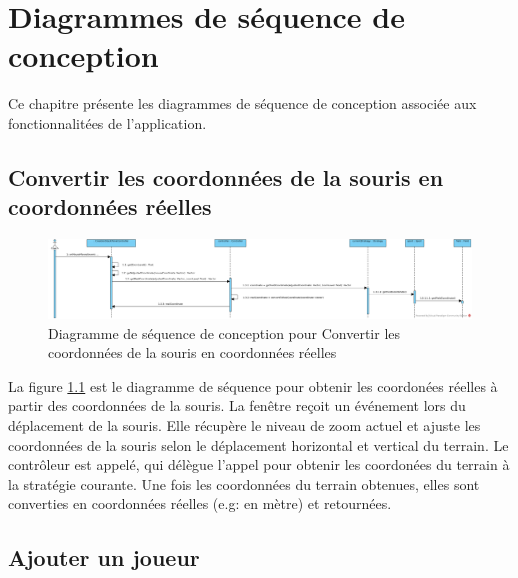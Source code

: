
\chapter{Diagrammes de séquence de conception}
\label{s:sequence_conception}

Ce chapitre présente les diagrammes de séquence de conception associée aux fonctionnalitées de l'application.

\section{Convertir les coordonnées de la souris en coordonnées réelles}
\label{sec:convertir_coordonnees_souris}

\begin{figure}[htpb]
    \centering
    \includegraphics[scale=0.7]{fig/dsc_getRealCoordinate.png}
    \caption{Diagramme de séquence de conception pour Convertir les coordonnées de la souris en coordonnées réelles}
    \label{fig:dsc_pixel_reel}
\end{figure}

La figure \ref{fig:dsc_pixel_reel} est le diagramme de séquence pour obtenir les coordonées réelles à partir des coordonnées de la souris.
La fenêtre reçoit un événement lors du déplacement de la souris.
Elle récupère le niveau de zoom actuel et ajuste les coordonnées de la souris selon le déplacement horizontal et vertical du terrain.
Le contrôleur est appelé, qui délègue l'appel pour obtenir les coordonées du terrain à la stratégie courante.
Une fois les coordonnées du terrain obtenues, elles sont converties en coordonnées réelles (e.g: en mètre) et retournées.


\section{Ajouter un joueur}
\label{sec:ajouter_joueur}


